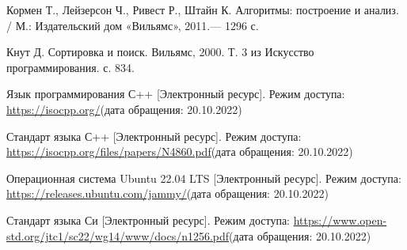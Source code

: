 \renewcommand{\bibname}{Список использованных источников}

\begin{thebibliography}{10}
	Кормен Т., Лейзерсон Ч., Ривест Р., Штайн К. Алгоритмы: построение и анализ. / М.: Издательский дом «Вильямс», 2011.— 1296 с.
	
	Кнут Д. Сортировка и поиск. Вильямс, 2000. Т. 3 из Искусство программирования. с. 834.
	
	Язык программирования С++ [Электронный ресурс]. Режим доступа: 
	\url{https://isocpp.org/}(дата обращения: 20.10.2022)
	
	Стандарт языка С++ [Электронный ресурс]. Режим доступа:
	\url{https://isocpp.org/files/papers/N4860.pdf}(дата обращения: 20.10.2022) 
	
	Операционная система Ubuntu 22.04 LTS [Электронный ресурс]. Режим доступа: 
	\url{https://releases.ubuntu.com/jammy/}(дата обращения: 20.10.2022)
	
	Стандарт языка Си [Электронный ресурс]. Режим доступа: 
	\url{https://www.open-std.org/jtc1/sc22/wg14/www/docs/n1256.pdf}(дата обращения: 20.10.2022) 
	
	
	
\end{thebibliography}





